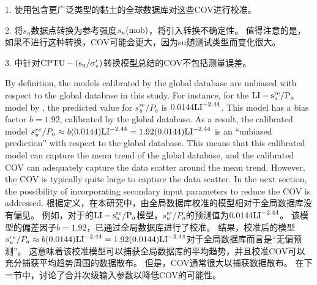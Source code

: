 \begin{Parallel}{0.60\textwidth}{}
{        1. 使用包含更广泛类型的黏土的全球数据库对这些COV进行校准。

        2. 将$s_u$数据点转换为参考强度$s_u(\rm{mob})$，将引入转换不确定性。 值得注意的是，如果不进行这种转换，COV可能会更大，因为su随测试类型而变化很大\citep{Ladd1977421}。
       
        3. \citet{Ching201252}中针对$\rm{CPTU}-(s_u/\sigma_v')$转换模型总结的COV不包括测量误差。
    }
    \ParallelPar
    \ParallelLText
    {
        By definition, the models calibrated by the global database are unbiased with respect to the global database in this study. For instance, for the $\rm{LI}-s_u^{re}/P_a$ model by \cite{Locat1988799}, the predicted value for $s_u^{re}/P_a$ is $0.0144\rm{LI}^{-2.44}$. This model has a bias factor $b = 1.92$, calibrated by the global database. As a result, the calibrated model $s_u^{re}/P_a\approx{}b(0.0144)\rm{LI}^{-2.44}=1.92(0.0144)\rm{LI}^{-2.44}$ is an “unbiased prediction” with respect to the global database. This means that this calibrated model can capture the mean trend of the global database, and the calibrated COV can adequately capture the data scatter around the mean trend. However, the COV is typically quite large to capture the data scatter. In the next section, the possibility of incorporating secondary input parameters to reduce the COV is addressed.
    }
    \ParallelRText
    {
        根据定义，在本研究中，由全局数据库校准的模型相对于全局数据库没有偏见。 例如，对于\cite{Locat1988799}的$\rm{LI}-s_u^{re}/P_a$模型，$s_u^{re}/P_a$的预测值为$0.0144\rm{LI}^{-2.44}$。 该模型的偏差因子$b = 1.92$，已通过全局数据库进行了校准。 结果，校准后的模型$s_u^{re}/P_a\approx{}b(0.0144)\rm{LI}^{-2.44}=1.92(0.0144)\rm{LI}^{-2.44}$对于全局数据库而言是“无偏预测”。 这意味着该校准模型可以捕获全局数据库的平均趋势，并且校准COV可以充分捕获平均趋势周围的数据散布。 但是，COV通常很大以捕获数据散布。 在下一节中，讨论了合并次级输入参数以降低COV的可能性。
    }
\end{Parallel}
